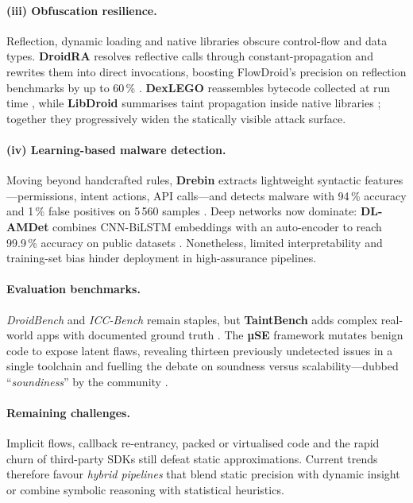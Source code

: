 \documentclass[a4paper,12pt]{report}
\begin{document}
\paragraph{(iii) Obfuscation resilience.}
Reflection, dynamic loading and native libraries obscure control-flow and data types.  \textbf{DroidRA} resolves reflective calls through constant-propagation and rewrites them into direct invocations, boosting FlowDroid’s precision on reflection benchmarks by up to 60\,\% \cite{li2016droidra}.  \textbf{DexLEGO} reassembles bytecode collected at run time \cite{ning2019dexlego}, while \textbf{LibDroid} summarises taint propagation inside native libraries \cite{libdroid2022}; together they progressively widen the statically visible attack surface.

\paragraph{(iv) Learning-based malware detection.}
Moving beyond handcrafted rules, \textbf{Drebin} extracts lightweight syntactic features—permissions, intent actions, API calls—and detects malware with 94\,\% accuracy and 1\,\% false positives on 5\,560 samples \cite{arp2014drebin}.  Deep networks now dominate: \textbf{DL-AMDet} combines CNN-BiLSTM embeddings with an auto-encoder to reach 99.9\,\% accuracy on public datasets \cite{nasser2023dlamdet}.  Nonetheless, limited interpretability and training-set bias hinder deployment in high-assurance pipelines.

\paragraph{Evaluation benchmarks.}
\emph{DroidBench} and \emph{ICC-Bench} remain staples, but \textbf{TaintBench} adds complex real-world apps with documented ground truth \cite{luo2022taintbench}.  The \textbf{µSE} framework mutates benign code to expose latent flaws, revealing thirteen previously undetected issues in a single toolchain and fuelling the debate on soundness versus scalability—dubbed ``\emph{soundiness}'' by the community \cite{bonett2018muse}.

\paragraph{Remaining challenges.}
Implicit flows, callback re-entrancy, packed or virtualised code and the rapid churn of third-party SDKs still defeat static approximations.  Current trends therefore favour \emph{hybrid pipelines} that blend static precision with dynamic insight or combine symbolic reasoning with statistical heuristics.
\end{document}
